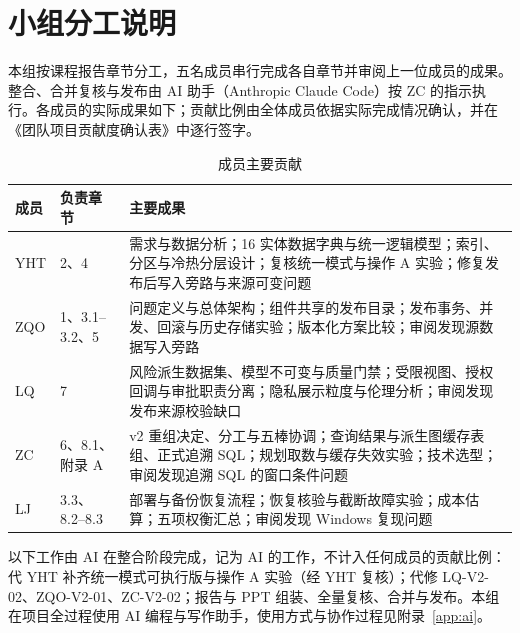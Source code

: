 \documentclass[a4paper,11pt,UTF8]{ctexart}
\begin{document}
\section{小组分工说明}

本组按课程报告章节分工，五名成员串行完成各自章节并审阅上一位成员的成果。整合、合并复核与发布由 AI 助手（Anthropic Claude Code）按 ZC 的指示执行。各成员的实际成果如下；贡献比例由全体成员依据实际完成情况确认，并在《团队项目贡献度确认表》中逐行签字。

\begin{table}[!htbp]\centering\small
\caption{成员主要贡献}
\begin{tabularx}{\textwidth}{L{1cm}L{3.2cm}Y}
\toprule
成员 & 负责章节 & 主要成果 \\
\midrule
YHT & 2、4 & 需求与数据分析；16 实体数据字典与统一逻辑模型；索引、分区与冷热分层设计；复核统一模式与操作 A 实验；修复发布后写入旁路与来源可变问题 \\
ZQO & 1、3.1–3.2、5 & 问题定义与总体架构；组件共享的发布目录；发布事务、并发、回滚与历史存储实验；版本化方案比较；审阅发现源数据写入旁路 \\
LQ & 7 & 风险派生数据集、模型不可变与质量门禁；受限视图、授权回调与审批职责分离；隐私展示粒度与伦理分析；审阅发现发布来源校验缺口 \\
ZC & 6、8.1、附录 A & v2 重组决定、分工与五棒协调；查询结果与派生图缓存表组、正式追溯 SQL；规划取数与缓存失效实验；技术选型；审阅发现追溯 SQL 的窗口条件问题 \\
LJ & 3.3、8.2–8.3 & 部署与备份恢复流程；恢复核验与截断故障实验；成本估算；五项权衡汇总；审阅发现 Windows 复现问题 \\
\bottomrule
\end{tabularx}
\end{table}

以下工作由 AI 在整合阶段完成，记为 AI 的工作，不计入任何成员的贡献比例：代 YHT 补齐统一模式可执行版与操作 A 实验（经 YHT 复核）；代修 LQ-V2-02、ZQO-V2-01、ZC-V2-02；报告与 PPT 组装、全量复核、合并与发布。本组在项目全过程使用 AI 编程与写作助手，使用方式与协作过程见附录~\ref{app:ai}。
\end{document}

